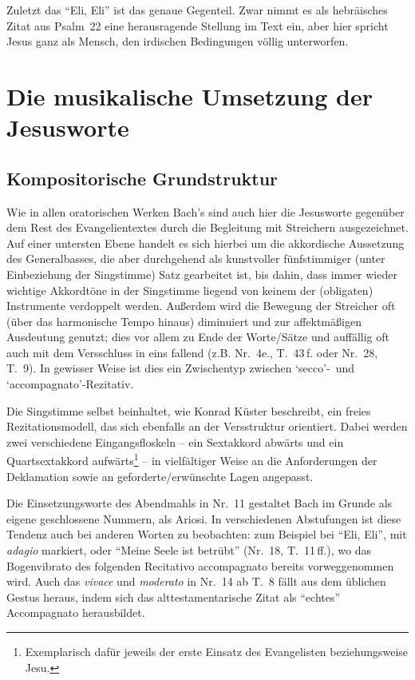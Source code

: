 \documentclass[a4paper,11pt,twoside]{scrartcl}
\begin{document}
Zuletzt das \enquote{Eli, Eli} ist das genaue Gegenteil.  Zwar nimmt
es als hebräisches Zitat aus Psalm~22 eine herausragende Stellung im
Text ein, aber hier spricht Jesus ganz als Mensch, den irdischen
Bedingungen völlig unterworfen.

\section{Die musikalische Umsetzung der Jesusworte}

\subsection{Kompositorische Grundstruktur}
Wie in allen oratorischen Werken Bach’s sind auch hier die Jesusworte
gegenüber dem Rest des Evangelientextes durch die Begleitung mit
Streichern ausgezeichnet.  Auf einer untersten Ebene handelt es sich
hierbei um die akkordische Aussetzung des Generalbasses, die aber
durchgehend als kunstvoller fünfstimmiger (unter Einbeziehung der
Singstimme) Satz gearbeitet ist, bis dahin, dass immer wieder
wichtige Akkordtöne in der Singstimme liegend von keinem der (obligaten)
Instrumente verdoppelt werden.  Außerdem wird die Bewegung der Streicher
oft (über das harmonische Tempo hinaus) diminuiert und zur affektmäßigen
Ausdeutung genutzt; dies vor allem zu Ende der Worte/Sätze und auffällig
oft auch mit dem Versschluss in eins fallend (z.B. Nr.~4e., T.~43\,f. oder
Nr.~28, T.~9).  In gewisser Weise ist dies ein Zwischentyp zwischen
\enquote*{secco}-~und \enquote*{accompagnato}-Rezitativ.

Die Singstimme selbst beinhaltet, wie Konrad Küster\cite{kuester} beschreibt,
ein freies Rezitationsmodell, das sich ebenfalls
an der Versstruktur orientiert.  Dabei werden zwei verschiedene
Eingangsfloskeln – ein Sextakkord abwärts und ein Quartsextakkord
aufwärts\footnote{Exemplarisch dafür jeweils der erste Einsatz des
Evangelisten beziehungsweise Jesu.} – in vielfältiger Weise an die
Anforderungen der Deklamation sowie an geforderte/erwünschte Lagen
angepasst.

Die Einsetzungsworte des Abendmahls in Nr.~11 gestaltet Bach im Grunde
als eigene geschlossene Nummern, als Ariosi.  In verschiedenen
Abstufungen ist diese Tendenz auch bei anderen Worten zu beobachten:
zum Beispiel bei \enquote{Eli, Eli}, mit \textit{adagio} markiert, oder
\enquote{Meine Seele ist betrübt} (Nr.~18, T.~11\,ff.), wo das Bogenvibrato
des folgenden Recitativo accompagnato bereits vorweggenommen wird.  Auch
das \textit{vivace} und \textit{moderato} in Nr.~14 ab T.~8 fällt aus
dem üblichen Gestus heraus, indem sich das alttestamentarische Zitat
als \enquote{echtes} Accompagnato herausbildet.
\end{document}
